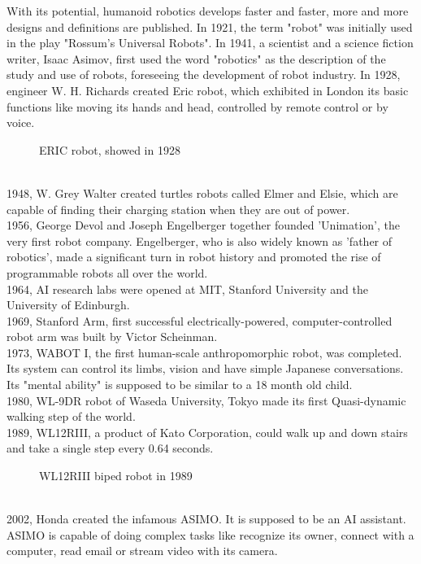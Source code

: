 \documentclass[pdftex,12pt,a4paper]{article}
\begin{document}
  \newpage
  With its potential, humanoid robotics develops faster and faster, more and more designs and definitions are published. In 1921, the term "robot" was initially used in the play "Rossum's Universal Robots". In 1941, a scientist and a science fiction writer, Isaac Asimov, first used the word "robotics" as the description of the study and use of robots, foreseeing the development of robot industry. 
  In 1928, engineer W. H. Richards created Eric robot, which exhibited in London its basic functions like moving its hands and head, controlled by remote control or by voice.
  \begin{figure}[h]
        \centering
        \caption{ERIC robot, showed in 1928}
        \label{fig:eric_robot}
  \end{figure} \\
  1948, W. Grey Walter created turtles robots called Elmer and Elsie, which are capable of finding their charging station when they are out of power. \\
  1956, George Devol and Joseph Engelberger together founded 'Unimation', the very first robot company. Engelberger, who is also widely known as 'father of robotics’, made a significant turn in robot history and promoted the rise of programmable robots all over the world. \\
  1964, AI research labs were opened at MIT, Stanford University and the University of Edinburgh. \\
  1969, Stanford Arm, first successful electrically-powered, computer-controlled robot arm was built by Victor Scheinman. \\
  1973, WABOT I, the first human-scale anthropomorphic robot, was completed. Its system can control its limbs, vision and have simple Japanese conversations. Its "mental ability" is supposed to be similar to a 18 month old child.\\
  1980, WL-9DR robot of Waseda University, Tokyo made its first Quasi-dynamic walking step of the world.\\
  1989, WL12RIII, a product of Kato Corporation, could walk up and down stairs and take a single step every 0.64 seconds.
  \begin{figure}[h]
          \centering
          \caption{WL12RIII biped robot in 1989}
          \label{fig:WL12RIII_robot}
  \end{figure}\\
  2002, Honda created the infamous ASIMO. It is supposed to be an AI assistant. ASIMO is capable of doing complex tasks like recognize its owner, connect with a computer, read email or stream video with its camera. \\
  
\end{document}
